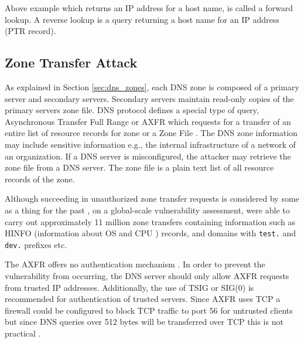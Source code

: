 Above example which returns an IP address for a host name, is called a forward lookup. A reverse lookup is a query returning a host name for an IP address (PTR record).

\subsection{Zone Transfer Attack}

As explained in Section \ref{sec:dns_zones}, each DNS zone is composed of a primary server and secondary servers. Secondary servers maintain read-only copies of the primary servers zone file. DNS protocol defines a special type of query, Asynchronous Transfer Full Range or \textsf{AXFR} which requests for a transfer of an entire list of resource records for zone or a Zone File \cite{RFC1034}. The DNS zone information may include sensitive information e.g., the internal infrastructure of a network of an organization. If a DNS server is misconfigured, the attacker may retrieve the zone file from a DNS server. The zone file is a plain text list of all resource records of the zone.

Although succeeding in unauthorized zone transfer requests is considered by some as a thing for the past \cite{network_sec_assessment}, on a global-scale vulnerability assessment,  \citet{global_zone_transfer} were able to carry out approximately 11 million zone transfers containing information such as \textsf{HINFO} (information about OS and CPU \cite{RFC1035}) records, and domains with \texttt{test.} and \texttt{dev.} prefixes etc.

The AXFR offers no authentication mechanism \cite{RFC1035}\cite{RFC5936}. In order to prevent the vulnerability from occurring, the DNS server should only allow AXFR requests from trusted IP addresses. Additionally, the use of TSIG or SIG(0) is recommended for authentication of trusted servers\cite{RFC5936}. Since AXFR uses TCP \cite{RFC1034}\cite{RFC1035} a firewall could be configured to block TCP traffic to port 56 for untrusted clients but since DNS queries over 512 bytes will be transferred over TCP this is not practical \cite{hacking_exposed}.






